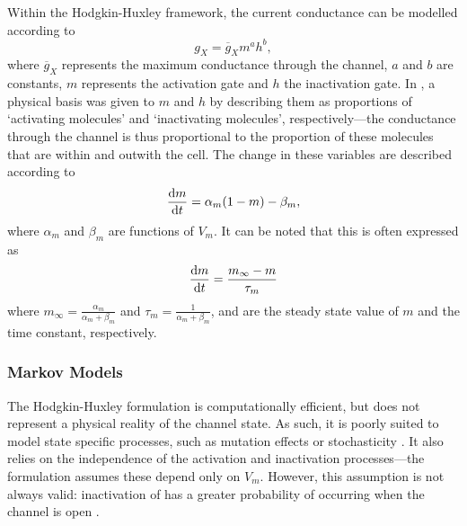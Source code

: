 \documentclass[../thesis-main.tex]{subfiles}
\begin{document}
Within the Hodgkin-Huxley framework, the current conductance can be modelled according to
\begin{equation}
 g_X = \overline{g}_Xm^a h^b,
\end{equation}
where $\overline{g}_X$ represents the maximum conductance through the channel, $a$ and $b$ are constants, $m$ represents the activation gate and $h$ the inactivation gate. In \citet{Hodgkin1952}, a physical basis was given to $m$ and $h$ by describing them as proportions of `activating molecules' and `inactivating molecules', respectively---the conductance through the channel is thus proportional to the proportion of these molecules that are within and outwith the cell. The change in these variables are described according to
\begin{equation}
 \frac{\textnormal{d}m}{\textnormal{d}t} = \alpha_m(1-m)-\beta_m,
\end{equation}
where $\alpha_m$ and $\beta_m$ are functions of $V_m$. It can be noted that this is often expressed as
\begin{equation}
 \frac{\textnormal{d}m}{\textnormal{d}t} = \frac{m_\infty-m}{\tau_m}
\end{equation}
where $m_\infty=\frac{\alpha_m}{\alpha_m+\beta_m}$ and $\tau_m=\frac{1}{\alpha_m+\beta_m}$, and are the steady state value of $m$ and the time constant, respectively.

\subsubsection{Markov Models}
\label{subsubsec:markov}
The Hodgkin-Huxley formulation is computationally efficient, but does not represent a physical reality of the channel state. As such, it is poorly suited to model state specific processes, such as mutation effects or stochasticity \citep{Adeniran2011}. It also relies on the independence of the activation and inactivation processes---the formulation assumes these depend only on $V_m$. However, this assumption is not always valid: inactivation of \ina{} has a greater probability of occurring when the channel is open \citep{Bezanilla1977, Armstrong1977}.
\end{document}
